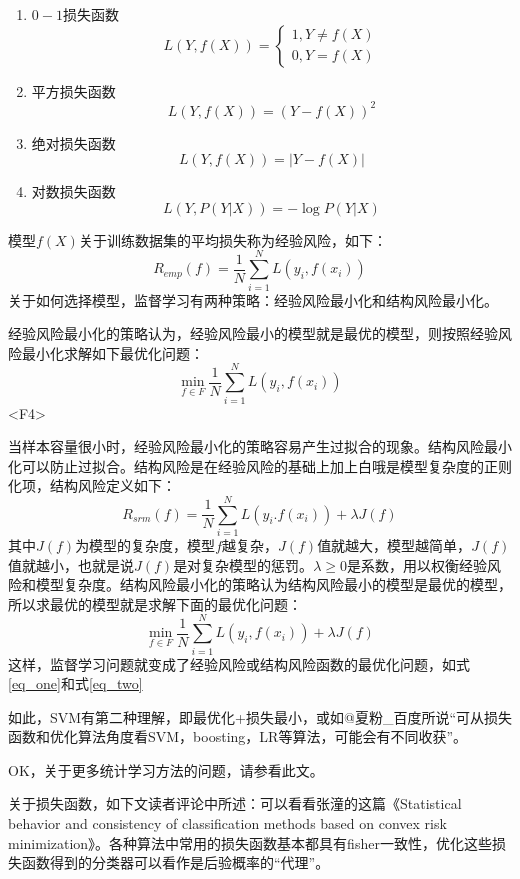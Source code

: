 \documentclass[a4paper,12pt]{article}
\begin{document}
\begin{enumerate}[(1)]
    \item $0-1$损失函数
      $$L(Y,f(X))=\left\{\begin{array}{l}1,Y\neq f(X)\\0,Y=f(X)\end{array}\right.$$
    \item 平方损失函数
      $$L(Y,f(X))=(Y-f(X))^2$$
    \item 绝对损失函数
      $$L(Y,f(X))=|Y-f(X)|$$
    \item 对数损失函数
      $$L(Y,P(Y|X))=-\log P(Y|X)$$
\end{enumerate}
模型$f(X)$关于训练数据集的平均损失称为经验风险，如下：
\begin{equation}
  R_{emp}(f)=\frac{1}{N}\sum_{i=1}^NL(y_i,f(x_i))
\end{equation}
关于如何选择模型，监督学习有两种策略：经验风险最小化和结构风险最小化。

经验风险最小化的策略认为，经验风险最小的模型就是最优的模型，则按照经验风险最小化求解如下最优化问题：
\begin{equation}
  \label{eq_one}
  \min_{f\in F}\frac{1}{N}\sum_{i=1}^NL(y_i,f(x_i))
\end{equation}<F4>

当样本容量很小时，经验风险最小化的策略容易产生过拟合的现象。结构风险最小化可以防止过拟合。结构风险是在经验风险的基础上加上白哦是模型复杂度的正则化项，结构风险定义如下：
\begin{equation}
  R_{srm}(f)=\frac{1}{N}\sum_{i=1}^NL(y_i.f(x_i))+\lambda J(f)
\end{equation}
其中$J(f)$为模型的复杂度，模型$f$越复杂，$J(f)$值就越大，模型越简单，$J(f)$值就越小，也就是说$J(f)$是对复杂模型的惩罚。$\lambda\geq0$是系数，用以权衡经验风险和模型复杂度。结构风险最小化的策略认为结构风险最小的模型是最优的模型，所以求最优的模型就是求解下面的最优化问题：
\begin{equation}\label{eq_two}
  \min_{f\in F}\frac{1}{N}\sum_{i=1}^NL(y_i,f(x_i))+\lambda J(f)
\end{equation}
这样，监督学习问题就变成了经验风险或结构风险函数的最优化问题，如式\ref{eq_one}和式\ref{eq_two}

如此，SVM有第二种理解，即最优化+损失最小，或如@夏粉\_百度所说“可从损失函数和优化算法角度看SVM，boosting，LR等算法，可能会有不同收获”。

OK，关于更多统计学习方法的问题，请参看此文。

关于损失函数，如下文读者评论中所述：可以看看张潼的这篇《Statistical behavior and consistency of classification methods based on convex risk minimization》。各种算法中常用的损失函数基本都具有fisher一致性，优化这些损失函数得到的分类器可以看作是后验概率的“代理”。
\end{document}
